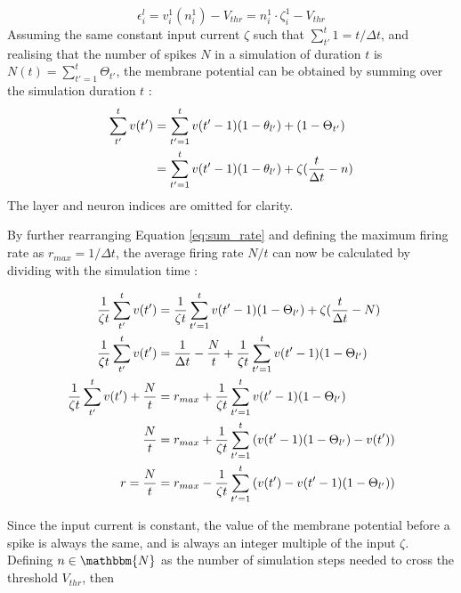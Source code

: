 \begin{equation}
\epsilon_i^l = v_i^1(n_i^1) - V_{thr} = n_i^1 \cdot \zeta_i^1 - V_{thr}
\label{eq:threshold}
\end{equation}
\noindent
Assuming the same constant input current $\zeta$ such that $\sum_{t'}^t 1 = t/\Delta t$, 
and realising that the number of spikes $N$ in a simulation of duration $t$ is
$N(t) = \sum_{t'=1}^t\Theta_{t'}$, 
the membrane potential can be obtained by summing over the simulation duration $t$
\cite{Rueckauer2017}:
\begin{equation}
\begin{split}
\sum_{t'}^tv(t') &= \sum_{t'=1}^t v(t' - 1)(1 - \theta_{l'}) + (1 - \Theta_{t'}) \\
     		 &= \sum_{t'=1}^t v(t' - 1)(1 - \theta_{l'}) + \zeta({t \over \Delta t} - n) \\
\end{split}
\label{eq:sum_rate}
\end{equation}
\noindent
The layer and neuron indices are omitted for clarity.

By further rearranging Equation \ref{eq:sum_rate} and defining the maximum firing rate 
as $r_{max} = 1 / \Delta t$, the average firing rate $N/t$ can now
be calculated by dividing with the simulation time \cite{Rueckauer2017}:

\begin{equation} 
\begin{split}
{1 \over \zeta t} \sum_{t'}^tv(t') &= {1 \over \zeta t} \sum_{t'=1}^t v(t' - 1)(1 - \Theta_{l'}) + \zeta({t \over \Delta t} - N) \\
{1 \over \zeta t} \sum_{t'}^tv(t') &= {1 \over \Delta t} - {N \over t} + {1 \over \zeta t} \sum_{t'=1}^t v(t' - 1)(1 - \Theta_{l'}) \\
{1 \over \zeta t} \sum_{t'}^tv(t') + {N \over t} &= r_{max} + {1 \over \zeta t} \sum_{t'=1}^t v(t' - 1)(1 - \Theta_{l'}) \\
{N \over t} &= r_{max} + {1 \over \zeta t} \sum_{t'=1}^t \left(v(t' - 1)(1 - \Theta_{l'}) - v(t')\right) \\
r = {N \over t} &= r_{max} - {1 \over \zeta t} \sum_{t'=1}^t \left(v(t') - v(t' - 1)(1 - \Theta_{l'})\right) \\
\end{split}
\label{eq:spike_rate_sum}
\end{equation}

\noindent
Since the input current is constant, the value of the membrane potential before a spike is always the same,
and is always an integer multiple of the input $\zeta$.
Defining $n \in \mathbbm{N}$ as the number of simulation steps needed to cross the threshold $V_{thr}$, then

